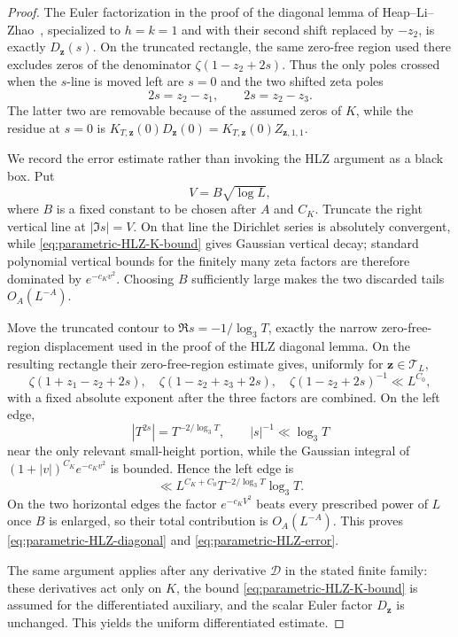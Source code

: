\begin{proof}
The Euler factorization in the proof of the diagonal lemma of
Heap--Li--Zhao~\cite{HLZ}, specialized to $h=k=1$ and with their second shift
replaced by $-z_2$, is exactly $D_{\mathbf z}(s)$. On the truncated rectangle,
the same zero-free region used there excludes zeros of the denominator
$\zeta(1-z_2+2s)$. Thus the only poles crossed when the $s$-line is moved left
are $s=0$ and the two shifted zeta poles
\[
 2s=z_2-z_1,\qquad 2s=z_2-z_3.
\]
The latter two are removable because of the assumed zeros of $K$, while the
residue at $s=0$ is $K_{T,\mathbf z}(0)D_{\mathbf z}(0)
=K_{T,\mathbf z}(0)Z_{\mathbf z,1,1}$.

We record the error estimate rather than invoking the HLZ argument as a black
box.  Put
\[
 V=B\sqrt{\log L},
\]
where $B$ is a fixed constant to be chosen after $A$ and $C_K$.  Truncate the
right vertical line at $|\Im s|=V$.  On that line the Dirichlet series is
absolutely convergent, while \eqref{eq:parametric-HLZ-K-bound} gives Gaussian
vertical decay; standard polynomial vertical bounds for the finitely many zeta
factors are therefore dominated by $e^{-c_Kv^2}$.  Choosing $B$ sufficiently
large makes the two discarded tails $O_A(L^{-A})$.

Move the truncated contour to $\Re s=-1/\log_3T$, exactly the narrow
zero-free-region displacement used in the proof of the HLZ diagonal lemma.
On the resulting rectangle their zero-free-region estimate gives, uniformly
for $\mathbf z\in\mathcal T_L$,
\[
 \zeta(1+z_1-z_2+2s),\quad
 \zeta(1-z_2+z_3+2s),\quad
 \zeta(1-z_2+2s)^{-1}
 \ll L^{C_0},
\]
with a fixed absolute exponent after the three factors are combined.  On the
left edge,
\[
 |T^{2s}|=T^{-2/\log_3T},
 \qquad
 |s|^{-1}\ll \log_3T
\]
near the only relevant small-height portion, while the Gaussian integral of
$(1+|v|)^{C_K}e^{-c_Kv^2}$ is bounded.  Hence the left edge is
\[
 \ll L^{C_K+C_0}T^{-2/\log_3T}\log_3T.
\]
On the two horizontal edges the factor $e^{-c_KV^2}$ beats every prescribed
power of $L$ once $B$ is enlarged, so their total contribution is
$O_A(L^{-A})$.  This proves \eqref{eq:parametric-HLZ-diagonal} and
\eqref{eq:parametric-HLZ-error}.

The same argument applies after any derivative $\mathcal D$ in the stated
finite family: these derivatives act only on $K$, the bound
\eqref{eq:parametric-HLZ-K-bound} is assumed for the differentiated auxiliary,
and the scalar Euler factor $D_{\mathbf z}$ is unchanged.  This yields the
uniform differentiated estimate.
\end{proof}

